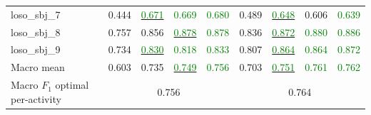 \begin{table}[t]
\begin{tabularx}{\linewidth}{@{}>{\raggedright\arraybackslash}X cccc @{\hspace{1.5em}} cccc@{}}
    loso_sbj_7 & 0.444 & \underline{\textcolor{green}{0.671}} & \textcolor{green}{0.669} & \textcolor{green}{0.680} & 0.489 & \underline{\textcolor{green}{0.648}} & 0.606 & \textcolor{green}{0.639} \\
    loso_sbj_8 & 0.757 & 0.856 & \underline{\textcolor{green}{0.878}} & \textcolor{green}{0.878} & 0.836 & \underline{\textcolor{green}{0.872}} & \textcolor{green}{0.880} & \textcolor{green}{0.886} \\
    loso_sbj_9 & 0.734 & \underline{\textcolor{green}{0.830}} & \textcolor{green}{0.818} & \textcolor{green}{0.833} & 0.807 & \underline{\textcolor{green}{0.864}} & \textcolor{green}{0.864} & \textcolor{green}{0.872} \\
    \midrule
    Macro mean & 0.603 & 0.735 & \underline{\textcolor{green}{0.749}} & \textcolor{green}{0.756} & 0.703 & \underline{\textcolor{green}{0.751}} & \textcolor{green}{0.761} & \textcolor{green}{0.762} \\
    Macro $F_1$ optimal per-activity & \multicolumn{4}{c}{0.756} & \multicolumn{4}{c}{0.764} \\
    \bottomrule
  \end{tabularx}
\end{table}